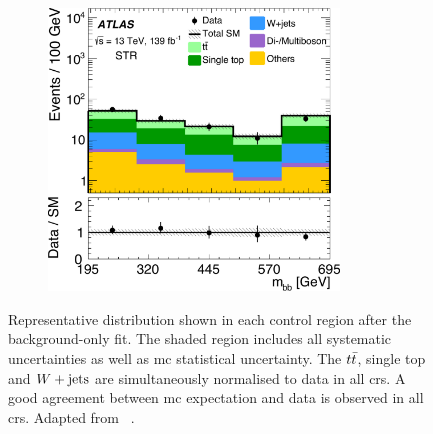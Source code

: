 \begin{figure}
\begin{subfigure}[b]{0.5\linewidth}
		\centering\includegraphics[width=0.85\textwidth]{fig_02e_yellow}
	\end{subfigure}\hfill

	\caption{Representative distribution shown in each control region after the background-only fit. The shaded region includes all systematic uncertainties as well as \gls{mc} statistical uncertainty. The $t\bar{t}$, single top and $W+\mathrm{jets}$ are simultaneously normalised to data in all \glspl{cr}. A good agreement between \gls{mc} expectation and data is observed in all \glspl{cr}. Adapted from ~\cite{SUSY-2019-08}.}
	\label{fig:CR_distributions_postfit}
\end{figure}



